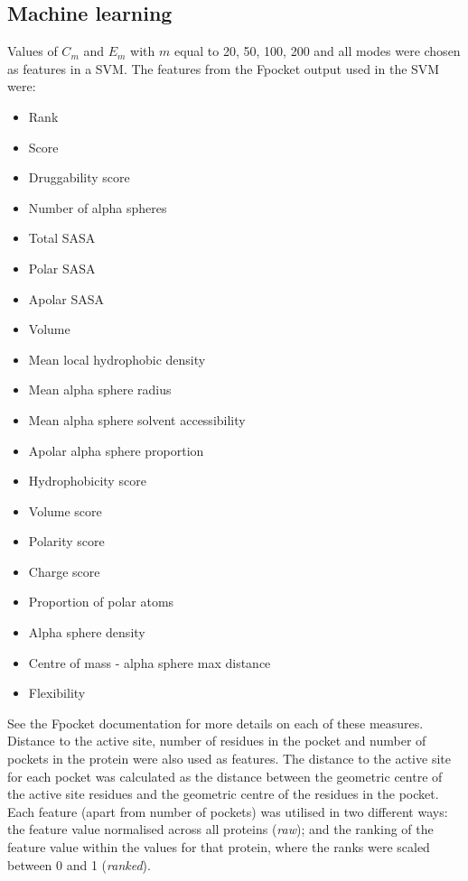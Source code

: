 \subsection{Machine learning}

Values of $C_{m}$ and $E_{m}$ with $m$ equal to 20, 50, 100, 200 and all modes were chosen as features in a SVM.
The features from the Fpocket output used in the SVM were:
\begin{itemize}
\item Rank
\item Score
\item Druggability score
\item Number of alpha spheres
\item Total SASA
\item Polar SASA
\item Apolar SASA
\item Volume
\item Mean local hydrophobic density
\item Mean alpha sphere radius
\item Mean alpha sphere solvent accessibility
\item Apolar alpha sphere proportion
\item Hydrophobicity score
\item Volume score
\item Polarity score
\item Charge score
\item Proportion of polar atoms
\item Alpha sphere density
\item Centre of mass - alpha sphere max distance
\item Flexibility
\end{itemize}

See the Fpocket documentation for more details on each of these measures.
Distance to the active site, number of residues in the pocket and number of pockets in the protein were also used as features.
The distance to the active site for each pocket was calculated as the distance between the geometric centre of the active site residues and the geometric centre of the residues in the pocket.
Each feature (apart from number of pockets) was utilised in two different ways: the feature value normalised across all proteins (\emph{raw}); and the ranking of the feature value within the values for that protein, where the ranks were scaled between 0 and 1 (\emph{ranked}).

